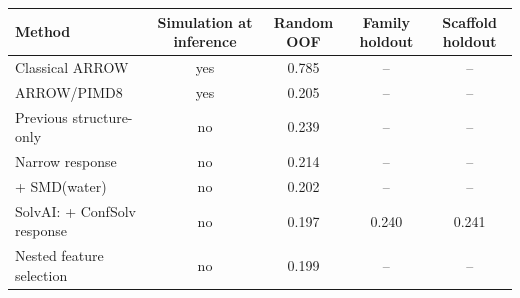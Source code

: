\begin{tabular}{lcccc}
\toprule
Method & Simulation at inference & Random OOF & Family holdout & Scaffold holdout \\
\midrule
Classical ARROW & yes & 0.785 & -- & -- \\
ARROW/PIMD8 & yes & 0.205 & -- & -- \\
Previous structure-only & no & 0.239 & -- & -- \\
Narrow response & no & 0.214 & -- & -- \\
+ SMD(water) & no & 0.202 & -- & -- \\
SolvAI: + ConfSolv response & no & 0.197 & 0.240 & 0.241 \\
Nested feature selection & no & 0.199 & -- & -- \\
\bottomrule
\end{tabular}

